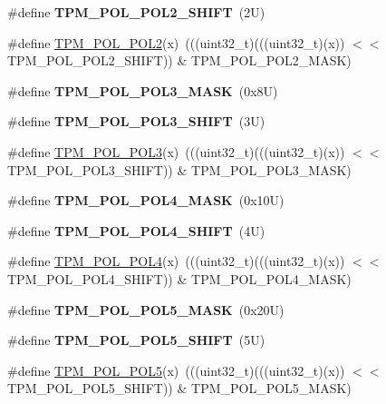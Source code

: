 \begin{DoxyCompactItemize}
\#define {\bfseries T\+P\+M\+\_\+\+P\+O\+L\+\_\+\+P\+O\+L2\+\_\+\+S\+H\+I\+FT}~(2\+U)
\item 
\#define \mbox{\hyperlink{group___t_p_m___register___masks_ga4901e2fe9de6eebbfa54904851f8a643}{T\+P\+M\+\_\+\+P\+O\+L\+\_\+\+P\+O\+L2}}(x)~(((uint32\+\_\+t)(((uint32\+\_\+t)(x)) $<$$<$ T\+P\+M\+\_\+\+P\+O\+L\+\_\+\+P\+O\+L2\+\_\+\+S\+H\+I\+FT)) \& T\+P\+M\+\_\+\+P\+O\+L\+\_\+\+P\+O\+L2\+\_\+\+M\+A\+SK)
\item 
\mbox{\label{group___t_p_m___register___masks_ga50f2e98cad779d2a60ddff115a98666c}} 
\#define {\bfseries T\+P\+M\+\_\+\+P\+O\+L\+\_\+\+P\+O\+L3\+\_\+\+M\+A\+SK}~(0x8\+U)
\item 
\mbox{\label{group___t_p_m___register___masks_ga66f86957c7b594a750937f2d73ca2329}} 
\#define {\bfseries T\+P\+M\+\_\+\+P\+O\+L\+\_\+\+P\+O\+L3\+\_\+\+S\+H\+I\+FT}~(3\+U)
\item 
\#define \mbox{\hyperlink{group___t_p_m___register___masks_ga209a5dd5f2d62805440af8b7201cf6c8}{T\+P\+M\+\_\+\+P\+O\+L\+\_\+\+P\+O\+L3}}(x)~(((uint32\+\_\+t)(((uint32\+\_\+t)(x)) $<$$<$ T\+P\+M\+\_\+\+P\+O\+L\+\_\+\+P\+O\+L3\+\_\+\+S\+H\+I\+FT)) \& T\+P\+M\+\_\+\+P\+O\+L\+\_\+\+P\+O\+L3\+\_\+\+M\+A\+SK)
\item 
\mbox{\label{group___t_p_m___register___masks_ga6db519f336232ed1b1734af9a33223f6}} 
\#define {\bfseries T\+P\+M\+\_\+\+P\+O\+L\+\_\+\+P\+O\+L4\+\_\+\+M\+A\+SK}~(0x10\+U)
\item 
\mbox{\label{group___t_p_m___register___masks_ga1e18371e371fcda30e501462e464bdf0}} 
\#define {\bfseries T\+P\+M\+\_\+\+P\+O\+L\+\_\+\+P\+O\+L4\+\_\+\+S\+H\+I\+FT}~(4\+U)
\item 
\#define \mbox{\hyperlink{group___t_p_m___register___masks_gaf7310b6b8399ae129fac6b8630f13ebd}{T\+P\+M\+\_\+\+P\+O\+L\+\_\+\+P\+O\+L4}}(x)~(((uint32\+\_\+t)(((uint32\+\_\+t)(x)) $<$$<$ T\+P\+M\+\_\+\+P\+O\+L\+\_\+\+P\+O\+L4\+\_\+\+S\+H\+I\+FT)) \& T\+P\+M\+\_\+\+P\+O\+L\+\_\+\+P\+O\+L4\+\_\+\+M\+A\+SK)
\item 
\mbox{\label{group___t_p_m___register___masks_ga7c38a4416b0424e562151935bbc95bcb}} 
\#define {\bfseries T\+P\+M\+\_\+\+P\+O\+L\+\_\+\+P\+O\+L5\+\_\+\+M\+A\+SK}~(0x20\+U)
\item 
\mbox{\label{group___t_p_m___register___masks_ga6b8051046653f64941cca6530c66c8a0}} 
\#define {\bfseries T\+P\+M\+\_\+\+P\+O\+L\+\_\+\+P\+O\+L5\+\_\+\+S\+H\+I\+FT}~(5\+U)
\item 
\#define \mbox{\hyperlink{group___t_p_m___register___masks_gab5b8ca3296a9c05a6d7ff21bf8bc0d11}{T\+P\+M\+\_\+\+P\+O\+L\+\_\+\+P\+O\+L5}}(x)~(((uint32\+\_\+t)(((uint32\+\_\+t)(x)) $<$$<$ T\+P\+M\+\_\+\+P\+O\+L\+\_\+\+P\+O\+L5\+\_\+\+S\+H\+I\+FT)) \& T\+P\+M\+\_\+\+P\+O\+L\+\_\+\+P\+O\+L5\+\_\+\+M\+A\+SK)
\end{DoxyCompactItemize}
